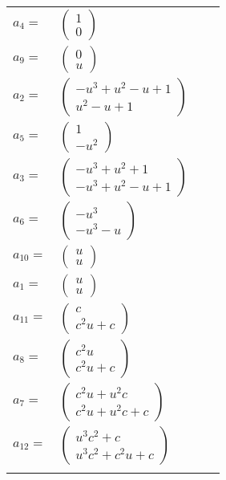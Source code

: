 \documentclass[1p]{elsarticle_modified}
\theoremstyle{definition}
\begin{document}
\begin{tabular}{m{7pt} m{180pt} m{7pt} m{180pt} }
\flushright $a_{4}=$&$\begin{pmatrix}1\\0\end{pmatrix}$ \\
\flushright $a_{9}=$&$\begin{pmatrix}0\\u\end{pmatrix}$ \\
\flushright $a_{2}=$&$\begin{pmatrix}- u^3+u^2- u+1\\u^2- u+1\end{pmatrix}$ \\
\flushright $a_{5}=$&$\begin{pmatrix}1\\- u^2\end{pmatrix}$ \\
\flushright $a_{3}=$&$\begin{pmatrix}- u^3+u^2+1\\- u^3+u^2- u+1\end{pmatrix}$ \\
\flushright $a_{6}=$&$\begin{pmatrix}- u^3\\- u^3- u\end{pmatrix}$ \\
\flushright $a_{10}=$&$\begin{pmatrix}u\\u\end{pmatrix}$ \\
\flushright $a_{1}=$&$\begin{pmatrix}u\\u\end{pmatrix}$ \\
\flushright $a_{11}=$&$\begin{pmatrix}c\\c^2 u+c\end{pmatrix}$ \\
\flushright $a_{8}=$&$\begin{pmatrix}c^2 u\\c^2 u+c\end{pmatrix}$ \\
\flushright $a_{7}=$&$\begin{pmatrix}c^2 u+u^2 c\\c^2 u+u^2 c+c\end{pmatrix}$ \\
\flushright $a_{12}=$&$\begin{pmatrix}u^3 c^2+c\\u^3 c^2+c^2 u+c\end{pmatrix}$\\&\end{tabular}
\end{document}
